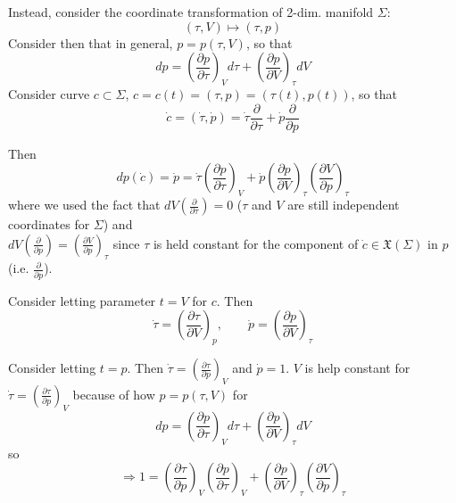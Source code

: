 \documentclass[twoside,landscape,10pt]{amsart}
\theoremstyle{plain}
\theoremstyle{definition}
\theoremstyle{remark}
\theoremstyle{remark}
\begin{document}
\begin{multicols*}{2}
Instead, consider the coordinate transformation of 2-dim. manifold $\Sigma$:
\[
(\tau, V) \mapsto (\tau, p)
\]
Consider then that in general, $p = p(\tau, V)$, so that 
\[
dp = \left( \frac{ \partial p }{ \partial \tau} \right)_V d\tau + \left( \frac{ \partial p }{ \partial V} \right)_{\tau} dV
\]
Consider curve $c\subset \Sigma$, $c=c(t) = (\tau, p) = (\tau(t), p(t))$, so that 
\[
\dot{c} = ( \dot{\tau}, \dot{p}) = \dot{\tau} \frac{ \partial }{ \partial \tau } + \dot{p} \frac{ \partial }{ \partial p}
\]

Then
\begin{equation}\label{Eq:CoordinateTransformationOfPressurep}
dp(\dot{c}) = \dot{p} = \dot{\tau} \left( \frac{ \partial p }{ \partial \tau} \right)_V + \dot{p} \left( \frac{\partial p}{ \partial V}\right)_{\tau}  \left( \frac{ \partial V}{ \partial p } \right)_{\tau}
\end{equation}
where we used the fact that $dV \left( \frac{ \partial }{ \partial \tau } \right) = 0 $ ($\tau$ and $V$ are still independent coordinates for $\Sigma$) and \\
$dV\left( \frac{ \partial }{ \partial p} \right) = \left( \frac{ \partial V}{ \partial p } \right)_{\tau}$ since $\tau$ is held constant for the component of $\dot{c} \in \mathfrak{X}(\Sigma)$ in $p$ (i.e. $\frac{\partial }{ \partial p}$).

Consider letting parameter $t=V$ for $c$. Then
\[
\dot{\tau} = \left( \frac{ \partial \tau }{ \partial V } \right)_p, \qquad \dot{p} = \left( \frac{ \partial p }{ \partial V} \right)_{\tau}
\]

Consider letting $t=p$. Then $\dot{\tau} = \left( \frac{ \partial \tau}{ \partial p} \right)_V$ and $\dot{p} = 1$. $V$ is help constant for $\dot{\tau} = \left( \frac{ \partial \tau}{ \partial p} \right)_V$ because of how $p = p(\tau, V)$ for 
\[
dp = \left(\frac{ \partial p}{ \partial \tau} \right)_V d\tau + \left( \frac{ \partial p }{ \partial V} \right)_{\tau} dV
\]
so
\begin{equation}\label{Eq:CoordinateTransformationOfPressurep2}
\Longrightarrow 1 = \left( \frac{ \partial \tau }{ \partial p } \right)_V \left( \frac{ \partial p }{ \partial \tau } \right)_V + \left( \frac{ \partial p }{ \partial V } \right)_{\tau} \left( \frac{ \partial V }{ \partial p } \right)_{\tau}
\end{equation}


\end{multicols*}
\end{document}
